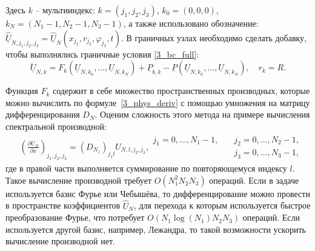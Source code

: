 \documentclass[12pt, a4paper]{report}
\newcommand{\lb}{\left (}
\newcommand{\rb}{\right )}
\newcommand{\vect}[1]{\underline{#1}}
\newcommand{\pdiff}[2]{\frac{\partial #1}{\partial #2}}
\begin{document}
Здесь $k$ -- мультииндекс: $k = (j_1,j_2,j_3)$, $k_0=(0,0,0)$, $k_N = (N_1-1,N_2-1,N_3-1)$, а также использовано обозначение: $\vect{\widehat U}_{N,j_1,j_2,j_3} = \vect{\widehat U}_{N}(x_{j_1}, r_{j_2}, \varphi_{j_3}, t)$. В граничных узлах необходимо сделать добавку, чтобы выполнялись граничные условия \eqref{3_bc_full}:
\begin{equation}\label{3_ode_boundary}
\vect{\ddot{U}}_{N,k} = F_{k}(\vect{U}_{N,k_0}, \dots, \vect{U}_{N,k_N}) + \vect{P}_{b,k} - \vect{P}(\vect{U}_{N,k_0}, \dots, \vect{U}_{N,k_N}), \quad r_k = R.
\end{equation}

Функция $F_k$ содержит в себе множество пространственных производных, которые можно вычислить по формуле~\eqref{3_phys_deriv} с помощью умножения на матрицу дифференцирования $D_N$. Оценим сложность этого метода на примере вычисления спектральной производной:
\begin{align} \label{3_spect_deriv_example}
&\lb\pdiff{U_N}{x}\rb_{j_1, j_2, j_3} = \lb D_{N_1}\rb_{j_1 l} U_{N,l,j_2,j_3},
\begin{split} 
j_1 = 0,\dots, N_1-1, \quad &j_2 = 0,\dots, N_2-1,\\
&j_3 = 0,\dots, N_3-1,
\end{split}
\end{align}
где в правой части выполняется суммирование по повторяющемуся индексу $l$. Такое вычисление производной требует $O(N_1^2N_2N_3)$ операций. Если в задаче используется базис Фурье или Чебышёва, то дифференцирование можно провести в пространстве коэффициентов $\widehat{U}_N$, для перехода к которым используется быстрое преобразование Фурье, что потребует $O\lb N_1\log(N_1) N_2 N_3\rb$ операций. Если используется другой базис, например, Лежандра, то такой возможности ускорить вычисление производной нет.
\end{document}
